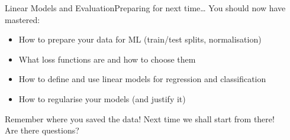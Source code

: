 \begin{frame}{Linear Models and Evaluation}{Preparing for next time\dots}
    You should now have mastered:
    \begin{itemize}
        \item How to prepare your data for ML (train/test splits, normalisation)
        \item What loss functions are and how to choose them
        \item How to define and use linear models for regression and classification
        \item How to regularise your models (and justify it)
    \end{itemize}
    \vfill \pause
    \begin{center}
        \huge
        Remember where you saved the data! Next time we shall start from there!
        \\[1em]
        Are there questions?
    \end{center}
    \vfill
\end{frame}
